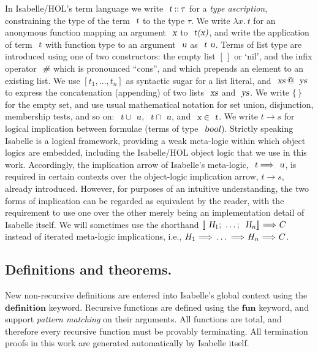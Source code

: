 In Isabelle/HOL's term language we write $\isa{t} \mathbin{::} \tau$ for a \emph{type ascription}, constraining the type of the term $\isa{t}$ to the type $\tau$.
We write $\lambda{x}.\: t$ for an anonymous function mapping an argument $\isa{x}$ to $\isa{t(x)}$, and write the application of term $\isa{t}$ with function type to an argument $\isa{u}$ as $\isa{t\ u}$.
Terms of list type are introduced using one of two constructors: the empty list $[\,]$ or `nil', and the infix operator $\isa{\#}$ which is pronounced ``cons'', and which prepends an element to an existing list.
We use $[t_1, \ldots, t_n]$ as syntactic sugar for a list literal, and $\isa{xs} \mathbin{\isacharat} \isa{ys}$ to express the concatenation (appending) of two lists $\isa{xs}$ and $\isa{ys}$.
We write $\{\,\}$ for the empty set, and use usual mathematical notation for set union, disjunction, membership tests, and so on: $\isa{t} \cup \isa{u}$, $\isa{t} \cap \isa{u}$, and $\isa{x} \in \isa{t}$.
We write $t \longrightarrow s$ for logical implication between formulae (terms of type $\isa{bool}$).
Strictly speaking Isabelle is a logical framework, providing a weak meta-logic within which object logics are embedded, including the Isabelle/HOL object logic that we use in this work.
Accordingly, the implication arrow of Isabelle's meta-logic, $\isa{t} \Longrightarrow \isa{u}$, is required in certain contexts over the object-logic implication arrow, $t \longrightarrow s$, already introduced.
However, for purposes of an intuitive understanding, the two forms of implication can be regarded as equivalent by the reader, with the requirement to use one over the other merely being an implementation detail of Isabelle itself.
We will sometimes use the shorthand ${\isasymlbrakk}\isa{H}_1{\isacharsemicolon}\ \ldots{\isacharsemicolon}\ \isa{H}_n{\isasymrbrakk}\ {\isasymLongrightarrow}\ C$ instead of iterated meta-logic implications, i.e., $H_1\ {\isasymLongrightarrow}\ \ldots\ {\isasymLongrightarrow}\ H_n\ {\isasymLongrightarrow}\ C$.

\subsection{Definitions and theorems.}

New non-recursive definitions are entered into Isabelle's global context using the $\mathbf{definition}$ keyword.
Recursive functions are defined using the $\mathbf{fun}$ keyword, and support \emph{pattern matching} on their arguments.
All functions are total, and therefore every recursive function must be provably terminating.
All termination proofs in this work are generated automatically by Isabelle itself.

